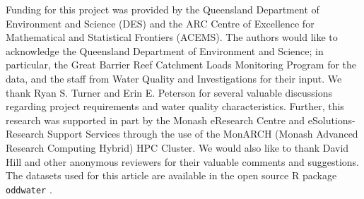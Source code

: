 \documentclass[draft]{agujournal2018} %
\begin{document}
%

%
%
%
%
%
%
%
%

\acknowledgments

Funding for this project was provided by the Queensland Department of
Environment and Science (DES) and the ARC Centre of Excellence for
Mathematical and Statistical Frontiers (ACEMS). The authors would like
to acknowledge the Queensland Department of Environment and Science; in
particular, the Great Barrier Reef Catchment Loads Monitoring Program
for the data, and the staff from Water Quality and Investigations for
their input. We thank Ryan S. Turner and Erin E. Peterson for several
valuable discussions regarding project requirements and water quality
characteristics. Further, this research was supported in part by the Monash eResearch Centre and eSolutions-Research Support Services through the use of the MonARCH (Monash Advanced Research Computing Hybrid) HPC Cluster. We would also like to thank David Hill and other anonymous reviewers
for  their valuable comments and suggestions. The datasets used for this article are available in the
open source R package \texttt{oddwater} \citep{oddwater2018}.


%

%
\end{document}
